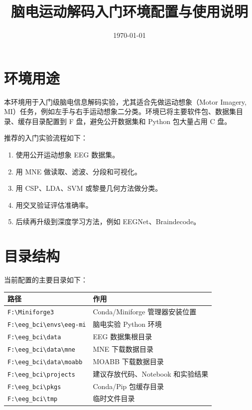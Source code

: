 \documentclass[UTF8,a4paper,12pt]{ctexart}
\title{脑电运动解码入门环境配置与使用说明}
\author{}
\date{\today}
\begin{document}
\maketitle

\section{环境用途}

本环境用于入门级脑电信息解码实验，尤其适合先做运动想象（Motor Imagery, MI）任务，例如左手与右手运动想象二分类。环境已将主要软件包、数据集目录、缓存目录配置到 F 盘，避免公开数据集和 Python 包大量占用 C 盘。

推荐的入门实验流程如下：

\begin{enumerate}[label=\arabic*.]
  \item 使用公开运动想象 EEG 数据集。
  \item 用 MNE 做读取、滤波、分段和可视化。
  \item 用 CSP、LDA、SVM 或黎曼几何方法做分类。
  \item 用交叉验证评估准确率。
  \item 后续再升级到深度学习方法，例如 EEGNet、Braindecode。
\end{enumerate}

\section{目录结构}

当前配置的主要目录如下：

\begin{table}[h]
\centering
\begin{tabular}{ll}
\toprule
路径 & 作用 \\
\midrule
\texttt{F:\textbackslash Miniforge3} & Conda/Miniforge 管理器安装位置 \\
\texttt{F:\textbackslash eeg\_bci\textbackslash envs\textbackslash eeg-mi} & 脑电实验 Python 环境 \\
\texttt{F:\textbackslash eeg\_bci\textbackslash data} & EEG 数据集根目录 \\
\texttt{F:\textbackslash eeg\_bci\textbackslash data\textbackslash mne} & MNE 下载数据目录 \\
\texttt{F:\textbackslash eeg\_bci\textbackslash data\textbackslash moabb} & MOABB 下载数据目录 \\
\texttt{F:\textbackslash eeg\_bci\textbackslash projects} & 建议存放代码、Notebook 和实验结果 \\
\texttt{F:\textbackslash eeg\_bci\textbackslash pkgs} & Conda/Pip 包缓存目录 \\
\texttt{F:\textbackslash eeg\_bci\textbackslash tmp} & 临时文件目录 \\
\bottomrule
\end{tabular}
\end{table}
\end{document}
